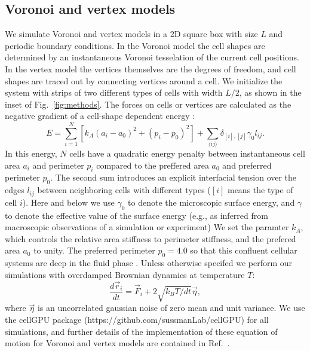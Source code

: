 \documentclass[twoside,twocolumn,9pt]{article}
\begin{document}
\subsection{Voronoi and vertex models}\label{sec:voroModel}
We simulate Voronoi and vertex models in a 2D square box with size $L$ and periodic boundary conditions. In the Voronoi model the cell shapes are determined by an instantaneous Voronoi tesselation of the current cell positions. In the vertex model the vertices themselves are the degrees of freedom, and cell shapes are traced out by connecting vertices around a cell. We initialize the system with strips of two different types of cells with width $L/2$, as shown in the inset of Fig.~\ref{fig:methods}. The forces on cells or vertices are calculated as the negative gradient of a cell-shape dependent energy \cite{sussman2017cellgpu, sussman2018soft}:
\begin{equation}
    \label{eq:agentBasedEnergy}
    E = \sum_{i=1}^N \left[ k_A (a_i -a_0)^2 +(p_i-p_0)^2 \right]+\sum_{\langle ij\rangle}\delta_{[i],[j]}\gamma_0 l_{ij}.
\end{equation}
In this energy, $N$ cells have  a quadratic energy penalty between instantaneous cell area $a_i$ and perimeter $p_i$ compared to the preffered area $a_0$ and preferred perimeter $p_0$. The second sum introduces an explicit interfacial tension over the edges $l_{ij}$ between neighboring cells with different types ($[i]$ means the type of cell $i$). Here and below we use $\gamma_0$ to denote the microscopic surface energy, and $\gamma$ to denote the effective value of the surface energy (e.g., as inferred from macroscopic observations of a simulation or experiment) We set the paramter $k_A$, which controls the relative area stiffness to perimeter stiffness, and the prefered area $a_0$ to unity. The preferred perimeter $p_0=4.0$ so that this confluent cellular systems are deep in the fluid phase \cite{bi2015density}. Unless otherwise specifed we perform our simulations with overdamped Brownian dynamics at temperature $T$: 
\begin{equation}
    \frac{d\vec{r}_i}{dt} = \vec{F}_i + 2\sqrt{k_BT/dt}\vec{\eta}, 
\end{equation}
where $\vec{\eta}$ is an uncorrelated gaussian noise of zero mean and unit variance. We use the cellGPU package (https://github.com/sussmanLab/cellGPU) for all simulations, and further details of the implementation of these equation of motion for Voronoi and vertex models are contained in Ref.~\cite{sussman2017cellgpu}.
\end{document}
